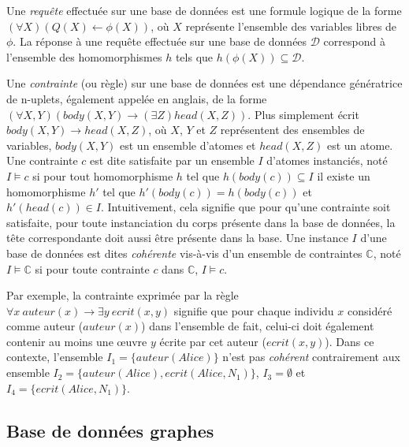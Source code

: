 \begin{definition}[Requête]
Une \emph{requête} effectuée sur une base de données est une formule logique de la forme $(\forall X)(Q(X) \gets \phi(X))$, où $X$ représente l'ensemble des variables libres de $\phi$.
La réponse à une requête effectuée sur une base de données $\mathcal{D}$ correspond à l'ensemble des homomorphismes $h$ tels que $h(\phi(X)) \subseteq \mathcal{D}$.
\end{definition}

\begin{definition}[Contrainte]
Une \emph{contrainte} (ou règle) sur une base de données est une dépendance génératrice de n-uplets, également appelée  en anglais, de la forme $(\forall X, Y)(body(X, Y) \to (\exists Z)head(X, Z))$.
Plus simplement écrit $body(X, Y) \to head(X, Z)$, où $X$, $Y$ et $Z$ représentent des ensembles de variables, $body(X, Y)$ est un ensemble d'atomes et $head(X, Z)$ est un atome.
Une contrainte $c$ est dite satisfaite par un ensemble $I$ d'atomes instanciés, noté $I \vDash c$ si pour tout homomorphisme $h$ tel que $h(body(c)) \subseteq I$ il existe un homomorphisme $h'$ tel que $h'(body(c)) = h(body(c))$ et $h'(head(c)) \in I$.
Intuitivement, cela signifie que pour qu'une contrainte soit satisfaite, pour toute instanciation du corps présente dans la base de données, la tête correspondante doit aussi être présente dans la base.
Une instance $I$ d'une base de données est dites \emph{cohérente} vis-à-vis d'un ensemble de contraintes $\mathbb{C}$, noté $I \vDash \mathbb{C}$ si pour toute contrainte $c$ dans $\mathbb{C}$, $I \vDash c$.

Par exemple, la contrainte exprimée par la règle $\forall x~auteur(x) \to \exists y~ecrit(x,y)$ signifie que pour chaque individu $x$ considéré comme auteur ($auteur(x)$) dans l'ensemble de fait, celui-ci doit également contenir au moins une œuvre $y$ écrite par cet auteur ($ecrit(x,y)$).
Dans ce contexte, l'ensemble $I_1 = \{auteur(Alice)\}$ n'est pas \emph{cohérent} contrairement aux ensemble $I_2 = \{auteur(Alice), ecrit(Alice, N_1)\}$, $I_3 = \emptyset$ et $I_4 = \{ecrit(Alice, N_1)\}$.
\end{definition}

\subsection{Base de données graphes}
\label{sec:update:pre:graph}

